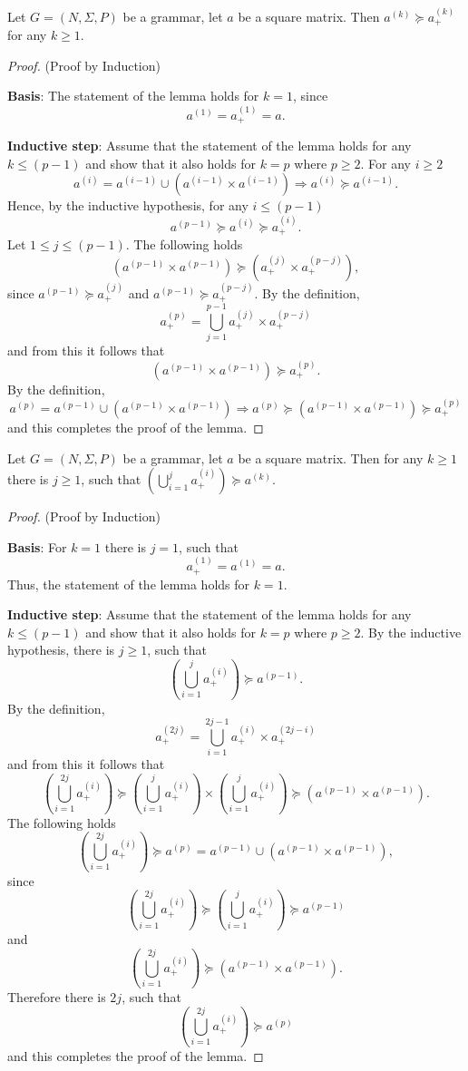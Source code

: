 \documentclass[runningheads,a4paper]{llncs}
\begin{document}
\begin{lemma}\label{lemma:cf_geq_valiant}
	Let $G =(N,\Sigma,P)$ be a grammar, let $a$ be a square matrix. Then $a^{(k)} \succeq a^{(k)}_+$ for any $k \geq 1$.
\end{lemma}
\begin{proof}(Proof by Induction)
	
	\textbf{Basis}: The statement of the lemma holds for $k = 1$, since $$a^{(1)} = a^{(1)}_+ = a.$$
	
	\textbf{Inductive step}: Assume that the statement of the lemma holds for any $k \leq (p - 1)$ and show that it also holds for $k = p$ where $p \geq 2$. For any $i \geq 2$ $$a^{(i)} = a^{(i-1)} \cup (a^{(i-1)} \times a^{(i-1)}) \Rightarrow a^{(i)} \succeq a^{(i-1)}.$$ Hence, by the inductive hypothesis, for any $i \leq (p-1)$ $$a^{(p-1)} \succeq a^{(i)} \succeq a^{(i)}_+.$$ Let $1 \leq j \leq (p - 1)$. The following holds $$(a^{(p-1)} \times a^{(p-1)}) \succeq (a^{(j)}_+ \times a^{(p-j)}_+),$$ since $a^{(p-1)} \succeq a^{(j)}_+$ and $a^{(p-1)} \succeq a^{(p-j)}_+$. By the definition, $$a^{(p)}_+ = \bigcup^{p-1}_{j=1}{a^{(j)}_+ \times a^{(p-j)}_+}$$ and from this it follows that $$(a^{(p-1)} \times a^{(p-1)}) \succeq a^{(p)}_+.$$ By the definition, $$a^{(p)} = a^{(p-1)} \cup (a^{(p-1)} \times a^{(p-1)}) \Rightarrow a^{(p)} \succeq (a^{(p-1)} \times a^{(p-1)}) \succeq a^{(p)}_+$$ and this completes the proof of the lemma.
\end{proof}

\begin{lemma}\label{lemma:valiant_geq_cf}
	Let $G =(N,\Sigma,P)$ be a grammar, let $a$ be a square matrix. Then for any $k \geq 1$ there is $j \geq 1$, such that $(\bigcup^{j}_{i=1}{a^{(i)}_+}) \succeq a^{(k)}$.
\end{lemma}
\begin{proof}(Proof by Induction)
	
	\textbf{Basis}: For $k = 1$ there is $j = 1$, such that $$a^{(1)}_+ = a^{(1)} = a.$$ Thus, the statement of the lemma holds for $k = 1$.
	
	\textbf{Inductive step}: Assume that the statement of the lemma holds for any $k \leq (p - 1)$ and show that it also holds for $k = p$ where $p \geq 2$. By the inductive hypothesis, there is $j \geq 1$, such that $$(\bigcup^{j}_{i=1}{a^{(i)}_+}) \succeq a^{(p-1)}.$$ By the definition, $$a^{(2j)}_+ = \bigcup^{2j-1}_{i=1}{a^{(i)}_+ \times a^{(2j-i)}_+}$$ and from this it follows that $$(\bigcup^{2j}_{i=1}{a^{(i)}_+}) \succeq (\bigcup^{j}_{i=1}{a^{(i)}_+}) \times (\bigcup^{j}_{i=1}{a^{(i)}_+}) \succeq (a^{(p-1)} \times a^{(p-1)}).$$ The following holds $$(\bigcup^{2j}_{i=1}{a^{(i)}_+}) \succeq a^{(p)} = a^{(p-1)} \cup (a^{(p-1)} \times a^{(p-1)}),$$ since $$(\bigcup^{2j}_{i=1}{a^{(i)}_+}) \succeq (\bigcup^{j}_{i=1}{a^{(i)}_+}) \succeq a^{(p-1)}$$ and $$(\bigcup^{2j}_{i=1}{a^{(i)}_+}) \succeq (a^{(p-1)} \times a^{(p-1)}).$$ Therefore there is $2j$, such that $$(\bigcup^{2j}_{i=1}{a^{(i)}_+}) \succeq a^{(p)}$$ and this completes the proof of the lemma.	
\end{proof}
\end{document}
